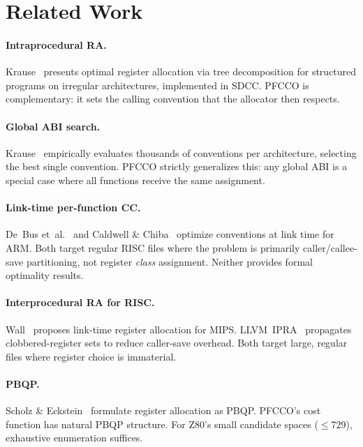 \documentclass[sigplan,screen,nonacm]{acmart}
\begin{document}
\section{Related Work}
\label{sec:related}

\paragraph{Intraprocedural RA.}
Krause~\cite{krause2013} presents optimal register allocation via tree
decomposition for structured programs on irregular architectures,
implemented in SDCC.  PFCCO is complementary: it sets the calling convention
that the allocator then respects.

\paragraph{Global ABI search.}
Krause~\cite{krause2022} empirically evaluates thousands of conventions per
architecture, selecting the best single convention.  PFCCO strictly
generalizes this: any global ABI is a special case where all functions
receive the same assignment.

\paragraph{Link-time per-function CC.}
De~Bus et~al.~\cite{debus2004} and Caldwell \&
Chiba~\cite{caldwell2017} optimize conventions at link time for ARM.  Both
target regular RISC files where the problem is primarily caller/callee-save
partitioning, not register \emph{class} assignment.  Neither provides formal
optimality results.

\paragraph{Interprocedural RA for RISC.}
Wall~\cite{wall1986} proposes link-time register allocation for MIPS.
LLVM~IPRA~\cite{llvm-ipra} propagates clobbered-register sets to reduce
caller-save overhead.  Both target large, regular files where register
choice is immaterial.

\paragraph{PBQP.}
Scholz \& Eckstein~\cite{scholz2002} formulate register allocation as PBQP.
PFCCO's cost function has natural PBQP structure.  For Z80's small candidate
spaces ($\le$729), exhaustive enumeration suffices.
\end{document}
